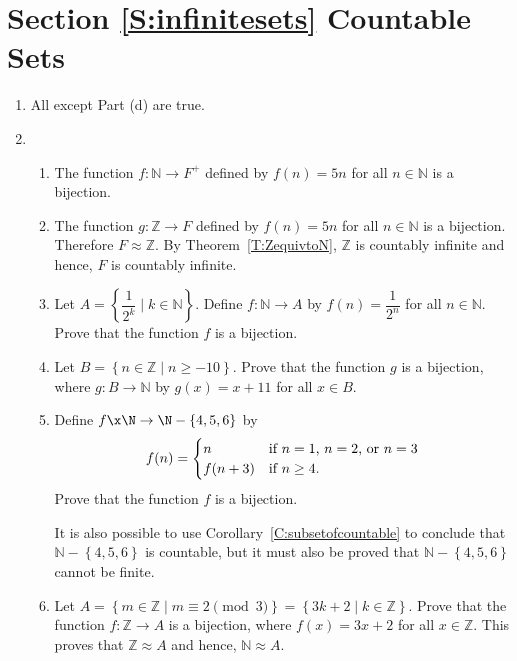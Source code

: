 \section*{Section \ref{S:infinitesets} Countable Sets}

\begin{enumerate}
\item All except Part (d) are true.


\item \begin{enumerate}
\item The function $f: \mathbb{N} \to F^+$ defined by $f \left( n \right) = 5n$ for all 
$n \in \mathbb{N}$ is a bijection.

\item The function $g: \mathbb{Z} \to F$ defined by $f \left( n \right) = 5n$ for all 
$n \in \mathbb{N}$ is a bijection.  Therefore $F \approx \mathbb{Z}$.  By 
Theorem~\ref{T:ZequivtoN}, $\mathbb{Z}$ is countably infinite and hence, $F$ is countably infinite.

\item Let $A = \left\{ \dfrac{1}{2^k} \mid k \in \mathbb{N} \right\}$.  Define 
$f: \mathbb{N} \to A$ by $f \left( n \right) = \dfrac{1}{2^n}$ for all $n \in \mathbb{N}$.  Prove that the function $f$ is a bijection.

\item Let $B = \left\{ n \in \mathbb{Z} \mid n \geq -10 \right\}$.  Prove that the function $g$ is a bijection, where $g: B \to \mathbb{N}$ by $g \left( x \right) = x + 11$ for all $x \in B$.

\item Define $f\x \N \to \N -\{4, 5, 6 \}$ by
\begin{equation} \notag
f( n ) = 
\begin{cases}
n                        &\text{if $n = 1$, $n = 2$, or $n = 3$} \\
f ( n + 3 )   &\text{if $n \geq 4$}.
\end{cases}
\end{equation}
Prove that the function $f$ is a bijection.

It is also possible to use Corollary~\ref{C:subsetofcountable} to conclude that $\mathbb{N} - \left\{ 4, 5, 6 \right\}$ is countable, but it must also be proved that 
$\mathbb{N} - \left\{ 4, 5, 6 \right\}$ cannot be finite.

\item  Let $A = \left\{ m \in \mathbb{Z} \mid m \equiv 2 \pmod 3 \right\} = 
\left\{ 3k + 2 \mid k \in \mathbb{Z} \right\}$.  Prove that the function $f: \mathbb{Z} \to A$ is a bijection, where $f \left( x \right) = 3x + 2$ for all $x \in \mathbb{Z}$.  This proves that 
$\mathbb{Z} \approx A$ and hence, $\mathbb{N} \approx A$.
\end{enumerate}




\end{enumerate}
